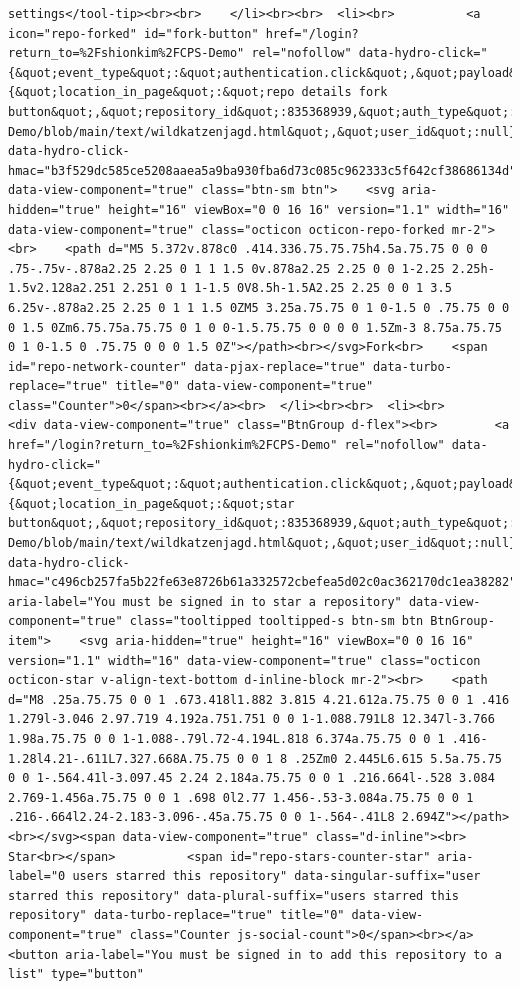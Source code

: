 \documentclass[
  letterpaper,
]{book}
\begin{document}
\begin{verbatim}
settings</tool-tip><br><br>    </li><br><br>  <li><br>          <a icon="repo-forked" id="fork-button" href="/login?return_to=%2Fshionkim%2FCPS-Demo" rel="nofollow" data-hydro-click="{&quot;event_type&quot;:&quot;authentication.click&quot;,&quot;payload&quot;:{&quot;location_in_page&quot;:&quot;repo details fork button&quot;,&quot;repository_id&quot;:835368939,&quot;auth_type&quot;:&quot;LOG_IN&quot;,&quot;originating_url&quot;:&quot;https://github.com/shionkim/CPS-Demo/blob/main/text/wildkatzenjagd.html&quot;,&quot;user_id&quot;:null}}" data-hydro-click-hmac="b3f529dc585ce5208aaea5a9ba930fba6d73c085c962333c5f642cf38686134d" data-view-component="true" class="btn-sm btn">    <svg aria-hidden="true" height="16" viewBox="0 0 16 16" version="1.1" width="16" data-view-component="true" class="octicon octicon-repo-forked mr-2"><br>    <path d="M5 5.372v.878c0 .414.336.75.75.75h4.5a.75.75 0 0 0 .75-.75v-.878a2.25 2.25 0 1 1 1.5 0v.878a2.25 2.25 0 0 1-2.25 2.25h-1.5v2.128a2.251 2.251 0 1 1-1.5 0V8.5h-1.5A2.25 2.25 0 0 1 3.5 6.25v-.878a2.25 2.25 0 1 1 1.5 0ZM5 3.25a.75.75 0 1 0-1.5 0 .75.75 0 0 0 1.5 0Zm6.75.75a.75.75 0 1 0 0-1.5.75.75 0 0 0 0 1.5Zm-3 8.75a.75.75 0 1 0-1.5 0 .75.75 0 0 0 1.5 0Z"></path><br></svg>Fork<br>    <span id="repo-network-counter" data-pjax-replace="true" data-turbo-replace="true" title="0" data-view-component="true" class="Counter">0</span><br></a><br>  </li><br><br>  <li><br>        <div data-view-component="true" class="BtnGroup d-flex"><br>        <a href="/login?return_to=%2Fshionkim%2FCPS-Demo" rel="nofollow" data-hydro-click="{&quot;event_type&quot;:&quot;authentication.click&quot;,&quot;payload&quot;:{&quot;location_in_page&quot;:&quot;star button&quot;,&quot;repository_id&quot;:835368939,&quot;auth_type&quot;:&quot;LOG_IN&quot;,&quot;originating_url&quot;:&quot;https://github.com/shionkim/CPS-Demo/blob/main/text/wildkatzenjagd.html&quot;,&quot;user_id&quot;:null}}" data-hydro-click-hmac="c496cb257fa5b22fe63e8726b61a332572cbefea5d02c0ac362170dc1ea38282" aria-label="You must be signed in to star a repository" data-view-component="true" class="tooltipped tooltipped-s btn-sm btn BtnGroup-item">    <svg aria-hidden="true" height="16" viewBox="0 0 16 16" version="1.1" width="16" data-view-component="true" class="octicon octicon-star v-align-text-bottom d-inline-block mr-2"><br>    <path d="M8 .25a.75.75 0 0 1 .673.418l1.882 3.815 4.21.612a.75.75 0 0 1 .416 1.279l-3.046 2.97.719 4.192a.751.751 0 0 1-1.088.791L8 12.347l-3.766 1.98a.75.75 0 0 1-1.088-.79l.72-4.194L.818 6.374a.75.75 0 0 1 .416-1.28l4.21-.611L7.327.668A.75.75 0 0 1 8 .25Zm0 2.445L6.615 5.5a.75.75 0 0 1-.564.41l-3.097.45 2.24 2.184a.75.75 0 0 1 .216.664l-.528 3.084 2.769-1.456a.75.75 0 0 1 .698 0l2.77 1.456-.53-3.084a.75.75 0 0 1 .216-.664l2.24-2.183-3.096-.45a.75.75 0 0 1-.564-.41L8 2.694Z"></path><br></svg><span data-view-component="true" class="d-inline"><br>          Star<br></span>          <span id="repo-stars-counter-star" aria-label="0 users starred this repository" data-singular-suffix="user starred this repository" data-plural-suffix="users starred this repository" data-turbo-replace="true" title="0" data-view-component="true" class="Counter js-social-count">0</span><br></a>        <button aria-label="You must be signed in to add this repository to a list" type="button" 
\end{verbatim}
\end{document}
